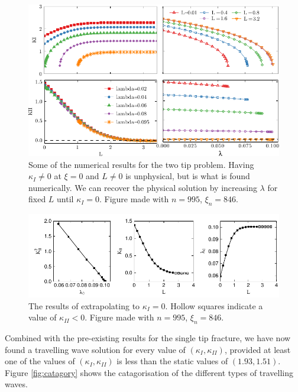 \documentclass{jfm}
\begin{document}
\begin{figure}
 \centerline{
\includegraphics{./../../Graphs/KI-KII-edited.pdf}}
  \caption{Some of the numerical results for the two tip problem. Having 
           $\kappa_{I} \neq 0$ at $\xi =0$ and $L \neq 0$ is unphysical, but
           is what is found numerically. We can recover the physical solution
           by increasing $\lambda$ for fixed $L$ until $\kappa_I =0$. Figure 
           made with $n = 995$, $\xi_n = 846$.}\label{fig:KI-KII}
\end{figure}

\begin{figure}
 \centerline{
\includegraphics{./../../Graphs/KI-0.pdf}}
  \caption{The results of extrapolating to $\kappa_I = 0$. Hollow squares 
           indicate a value of $\kappa_{II} <0$. Figure 
           made with $n = 995$, $\xi_n = 846$.}\label{fig:KI-0}
\end{figure}

Combined with the pre-existing results for the single tip fracture, we have now
found a travelling wave solution for every value of $(\kappa_I,\kappa_{II})$, 
provided at least one of the values of $(\kappa_I,\kappa_{II})$ is less than
the static values of $(1.93,1.51)$. Figure \ref{fig:catagory} shows the 
catagorisation of the different types of travelling waves.
\end{document}
